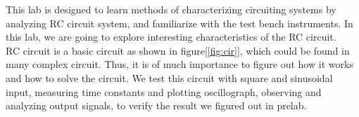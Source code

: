 This lab is designed to learn methods of characterizing circuiting systems by analyzing RC circuit system, and familiarize with the test bench instruments. In this lab, we are going to explore interesting characteristics of the RC circuit. \\
\phantom{ } RC circuit is a basic circuit as shown in figure[\ref{fig:cir}], which could be found in many complex circuit. Thus, it is of much importance to figure out how it works and how to solve the circuit. We test this circuit with square and sinusoidal input, measuring time constants and plotting oscillograph, observing and analyzing output signals, to verify the result we figured out in prelab.